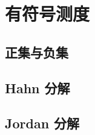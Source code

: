 \section{有符号测度}
\label{b1:sec:0601}


\subsection{正集与负集}
\label{b1:subsec:060101}

\subsection{Hahn 分解}
\label{b1:subsec:060102}

\subsection{Jordan 分解}
\label{b1:subsec:060103}


